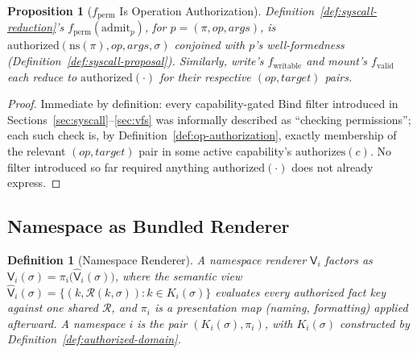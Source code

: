 \documentclass[11pt]{article}
\newtheorem{definition}{Definition}[section]
\newtheorem{proposition}{Proposition}[section]
\begin{document}
\begin{proposition}[$f_{\mathrm{perm}}$ Is Operation Authorization]
\label{prop:fperm-is-authorized}
Definition~\ref{def:syscall-reduction}'s $f_{\mathrm{perm}}(\mathrm{admit}_p)$, for $p=(\pi,\mathit{op},\mathit{args})$, is $\mathrm{authorized}(\mathrm{ns}(\pi), \mathit{op}, \mathit{args}, \sigma)$ conjoined with $p$'s well-formedness (Definition~\ref{def:syscall-proposal}). Similarly, write's $f_{\mathrm{writable}}$ and mount's $f_{\mathrm{valid}}$ each reduce to $\mathrm{authorized}(\cdot)$ for their respective $(\mathit{op},\mathit{target})$ pairs.
\end{proposition}
\begin{proof}
Immediate by definition: every capability-gated Bind filter introduced in Sections~\ref{sec:syscall}--\ref{sec:vfs} was informally described as ``checking permissions''; each such check is, by Definition~\ref{def:op-authorization}, exactly membership of the relevant $(\mathit{op},\mathit{target})$ pair in some active capability's $\mathrm{authorizes}(c)$. No filter introduced so far required anything $\mathrm{authorized}(\cdot)$ does not already express.
\end{proof}

\subsection{Namespace as Bundled Renderer}

\begin{definition}[Namespace Renderer]
\label{def:namespace-renderer-v2}
A namespace renderer $\mathsf{V}_i$ factors as $\mathsf{V}_i(\sigma) = \pi_i\big(\widehat{\mathsf{V}}_i(\sigma)\big)$, where the \emph{semantic view} $\widehat{\mathsf{V}}_i(\sigma) = \{(k, \mathcal{R}(k,\sigma)) : k \in K_i(\sigma)\}$ evaluates every authorized fact key against one shared $\mathcal{R}$, and $\pi_i$ is a presentation map (naming, formatting) applied afterward. A namespace $i$ is the pair $(K_i(\sigma), \pi_i)$, with $K_i(\sigma)$ constructed by Definition~\ref{def:authorized-domain}.
\end{definition}
\end{document}
